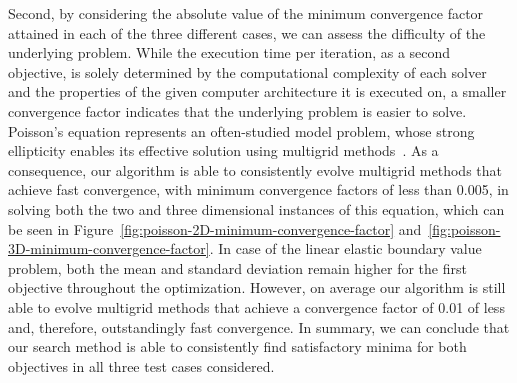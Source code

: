 Second, by considering the absolute value of the minimum convergence factor attained in each of the three different cases, we can assess the difficulty of the underlying problem.
While the execution time per iteration, as a second objective, is solely determined by the computational complexity of each solver and the properties of the given computer architecture it is executed on, a smaller convergence factor indicates that the underlying problem is easier to solve.
Poisson's equation represents an often-studied model problem, whose strong ellipticity enables its effective solution using multigrid methods~\cite{trottenberg2000multigrid}.
As a consequence, our algorithm is able to consistently evolve multigrid methods that achieve fast convergence, with minimum convergence factors of less than 0.005, in solving both the two and three dimensional instances of this equation, which can be seen in Figure~\ref{fig:poisson-2D-minimum-convergence-factor} and~\ref{fig:poisson-3D-minimum-convergence-factor}.
In case of the linear elastic boundary value problem, both the mean and standard deviation remain higher for the first objective throughout the optimization.
However, on average our algorithm is still able to evolve multigrid methods that achieve a convergence factor of 0.01 of less and, therefore, outstandingly fast convergence.
In summary, we can conclude that our search method is able to consistently find satisfactory minima for both objectives in all three test cases considered.


